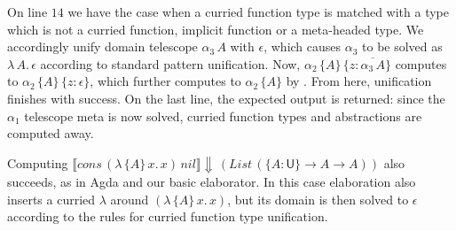 \documentclass[acmsmall,screen,dvipsnames]{acmart}\settopmatter{}
\newcommand{\slet}{\boldsymbol{\mathsf{let}}}
\renewcommand{\sin}{\boldsymbol{\mathsf{in}}}
\renewcommand{\U}{\mathsf{U}}
\newcommand{\emptycon}{\scaleobj{.75}\bullet}
\newcommand{\unify}{\mathsf{unify}}
\newcommand{\mi}[1]{\mathit{#1}}
\newcommand{\echeckt}[2]{\llbracket#1\rrbracket\!\Downarrow\,#2}
\newcommand{\einfert}[1]{\llbracket#1\rrbracket\!\Uparrow}
\newcommand{\true}{\mathsf{true}}
\newcommand{\Tel}{\mathsf{Tel}}
\newcommand{\Rec}{\mathsf{Rec}}
\newcommand{\ol}[1]{\overline{#1}}
\theoremstyle{remark}
\begin{document}
\begin{example}
On line $\scriptstyle{14}$ we have the case when a curried function type is
matched with a type which is not a curried function, implicit function or a
meta-headed type. We accordingly unify domain telescope $\alpha_3\,A$ with
$\epsilon$, which causes $\alpha_3$ to be solved as $\lambda\,A.\,\epsilon$
according to standard pattern unification. Now, $\alpha_2\,\{A\}\,\{z :
\ol{\alpha_3\,A}\}$ computes to $\alpha_2\,\{A\}\,\{z : \epsilon\}$, which
further computes to $\alpha_2\,\{A\}$ by . From here,
unification finishes with success. On the last line, the expected output is
returned: since the $\alpha_1$ telescope meta is now solved, curried function
types and abstractions are computed away.

Computing
$\echeckt{\mi{cons}\,(\lambda\,\{A\}\,x.\,x)\,\mi{nil}}{(\mi{List}\,(\{A :
  \U\}\to A \to A))}$ also succeeds, as in Agda and our basic elaborator. In
this case elaboration also inserts a curried $\lambda$ around
$(\lambda\,\{A\}\,x.\,x)$, but its domain is then solved to $\epsilon$ according
to the rules for curried function type unification.

\end{example}

\end{document}
